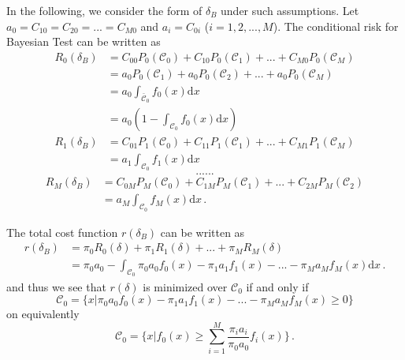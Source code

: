 In the following, we consider the form of $\delta_B$ under such assumptions.
Let $a_0 = C_{10} = C_{20} = ... = C_{M0}$ and $a_i = C_{0i}$ ($i= 1, 2, ..., M$).
The conditional risk for Bayesian Test can be written as 
\begin{equation}
\begin{split}
R_0(\delta_B) &= C_{00}P_0(\mathcal{C}_0) + C_{10}P_0(\mathcal{C}_1) + ... +  C_{M0}P_0(\mathcal{C}_M)\\
&= a_0P_0(\mathcal{C}_1) + a_0P_0(\mathcal{C}_2) + ... + a_0P_0(\mathcal{C}_M)\\
&= a_0 \int_{\bar{\mathcal{C}}_0}f_0(x)\mathrm{d}x\\
&= a_0(1 - \int_{\mathcal{C}_0}f_0(x)\mathrm{d}x)
\end{split}
\end{equation}
\begin{equation}
\begin{split}
R_1(\delta_B) &= C_{01}P_1(\mathcal{C}_0) + C_{11}P_1(\mathcal{C}_1) + ... +  C_{M1}P_1(\mathcal{C}_M)\\  
&= a_1\int_{\mathcal{C}_0}f_1(x)\mathrm{d}x
\end{split}
\end{equation}
\[
......
\]
\begin{equation}
\begin{split}
R_M(\delta_B) &= C_{0M}P_M(\mathcal{C}_0) + C_{1M}P_M(\mathcal{C}_1) + ... +  C_{2M}P_M(\mathcal{C}_2)\\
&= a_M\int_{\mathcal{C}_0}f_{M}(x)\mathrm{d}x\,.
\end{split}
\end{equation}

The total cost function $r(\delta_B)$ can be written as 
\begin{equation}
\begin{split}
\label{r00}
r(\delta_B) &= \pi_0 R_0(\delta) + \pi_1R_1(\delta) + ... +  \pi_MR_M(\delta)\\
&= \pi_0a_0 - \int_{\mathcal{C}_0}\pi_0a_0f_0(x) - \pi_1a_1f_1(x) - ... - \pi_Ma_Mf_M(x) \mathrm{d}x\,. 
\end{split}
\end{equation}
and thus we see that $r(\delta)$ is minimized over $\mathcal{C}_0$ if and only if 
\begin{equation}
\label{equ: C}
\mathcal{C}_0 =  \{ x | \pi_0a_0f_0(x) - \pi_1a_1f_1(x) - ... - \pi_Ma_Mf_M(x) \geq 0\}
\end{equation}
on equivalently
\begin{equation}
  \mathcal{C}_0 = \{ x | f_0(x) \geq \sum_{i=1}^{M}\frac{\pi_ia_i}{\pi_0a_0}f_i(x) \}\,.
  \label{2015feb04a1}
\end{equation}

